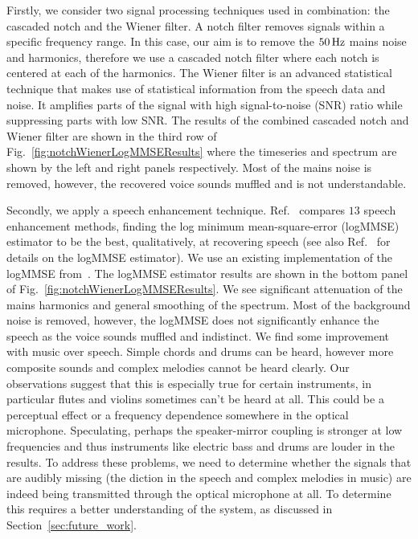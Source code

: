 \documentclass[paper-main.tex]{subfiles}
\begin{document}
Firstly, we consider two signal processing techniques used in combination: the cascaded notch and the Wiener filter. 
A notch filter removes signals within a specific frequency range. 
In this case, our aim is to remove the $50\,{\rm Hz}$ mains noise and harmonics, therefore we use a cascaded notch filter where each notch is centered at each of the harmonics. 
The Wiener filter is an advanced statistical technique that makes use of statistical information from the speech data and noise. 
It amplifies parts of the signal with high signal-to-noise (SNR) ratio while suppressing parts with low SNR. 
The results of the combined cascaded notch and Wiener filter are shown in the third row of Fig.~\ref{fig:notchWienerLogMMSEResults} where the timeseries and spectrum are shown by the left and right panels respectively. 
Most of the mains noise is removed, however, the recovered voice sounds muffled and is not understandable. 


Secondly, we apply a speech enhancement technique. 
Ref.~\cite{SubjectiveComparison} compares $13$ speech enhancement methods, finding the log minimum mean-square-error (logMMSE) estimator to be the best, qualitatively, at recovering speech (see also Ref.~\cite{Ephraim1984SpeechEU_logMMSE} for details on the logMMSE estimator). 
We use an existing implementation of the logMMSE from~\cite{logmmse}.  
The logMMSE estimator results are shown in the bottom panel of Fig.~\ref{fig:notchWienerLogMMSEResults}. 
We see significant attenuation of the mains harmonics and general smoothing of the spectrum. 
Most of the background noise is removed, however, the logMMSE does not significantly enhance the speech as the voice sounds muffled and indistinct.
We find some improvement with music over speech. 
Simple chords and drums can be heard, however more composite sounds and complex melodies cannot be heard clearly. 
Our observations suggest that this is especially true for certain instruments, in particular flutes and violins sometimes can’t be heard at all. 
This could be a perceptual effect or a frequency dependence somewhere in the optical microphone.
Speculating, perhaps the speaker-mirror coupling is stronger at low frequencies and thus instruments like electric bass and drums are louder in the results.
To address these problems, we need to determine whether the signals that are audibly missing (the diction in the speech and complex melodies in music) are indeed being transmitted through the optical microphone at all. 
To determine this requires a better understanding of the system, as discussed in Section~\ref{sec:future_work}.
\end{document}
